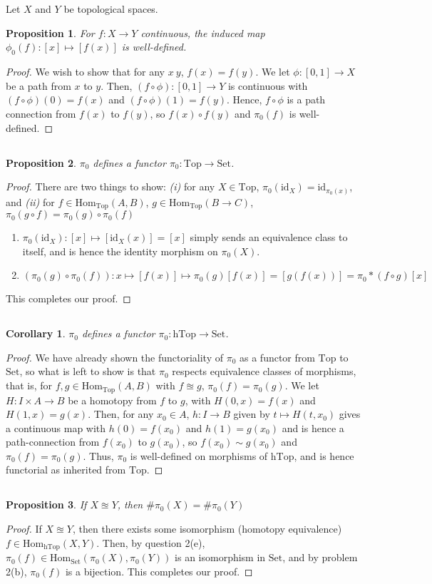 \documentclass[english]{article}
\newcommand{\prob}[1]{\setcounter{section}{#1-1}\section{}}
\newcommand{\prt}[1]{\setcounter{subsection}{#1-1}\subsection{}}
\newtheorem*{proposition*}{Proposition}
\newtheorem*{corollary*}{Corollary}
\theoremstyle{remark}
\theoremstyle{definition}
\newcommand{\id}{\mathrm{id}}
\renewcommand{\hom}{\mathrm{Hom}}
\newcommand{\Top}{\mathrm{Top}}
\renewcommand{\top}{\Top}
\newcommand{\hTop}{\mathrm{hTop}}
\newcommand{\set}{\mathrm{Set}}
\begin{document}
\prob{3}
\prt{1}Let $X$ and $Y$ be topological spaces. \begin{proposition*}
	For $f:X\to Y$ continuous, the induced map $\phi_0(f):[x]\mapsto[f(x)]$ is well-defined.
\end{proposition*}
\begin{proof}
	We wish to show that for any $x~y$, $f(x)=f(y)$. We let $\phi:[0,1]\to X$ be a path from $x$ to $y$. Then, $(f\circ\phi):[0,1]\to Y$ is continuous with $(f\circ\phi)(0)=f(x)$ and $(f\circ \phi)(1)=f(y)$. Hence, $f\circ \phi$ is a path connection from $f(x)$ to $f(y)$, so $f(x)\circ f(y)$ and $\pi_0(f)$ is well-defined.
\end{proof}
\prt{2}\begin{proposition*}
	$\pi_0$ defines a functor $\pi_0:\top\to\set$.
\end{proposition*}
\begin{proof}
	There are two things to show: \emph{(i)} for any $X\in \top$, $\pi_0(\id_X)=\id_{\pi_0(x)}$, and \emph{(ii)} for $f\in \hom_\top(A,B)$, $g\in \hom_{\top}(B\to C)$, $\pi_0(g\circ f)=\pi_0(g)\circ \pi_0(f)$
	\begin{enumerate}[label=\emph{(\roman*)}]
		\item $\pi_0(\id_X):[x]\mapsto [\id_X(x)]=[x]$ simply sends an equivalence class to itself, and is hence the identity morphism on $\pi_0(X)$. 
		\item $(\pi_0(g)\circ \pi_0(f)):x\mapsto [f(x)]\mapsto \pi_0(g)[f(x)]=[g(f(x))]=\pi_0*(f\circ g)[x]$
	\end{enumerate}
This completes our proof.
\end{proof}
\prt{3} \begin{corollary*}
	$\pi_0$ defines a functor $\pi_0:\hTop\to\set$.
\end{corollary*}
\begin{proof}
	We have already shown the functoriality of $\pi_0$ as a functor from $\top$ to $\set$, so what is left to show is that $\pi_0$ respects equivalence classes of morphisms, that is, for $f,g\in \hom_{\top}(A,B)$ with $f\approxeq g$, $\pi_0(f)=\pi_0(g)$. We let $H:I\times A\to B$ be a homotopy from $f$ to $g$, with $H(0,x)=f(x)$ and $H(1,x)=g(x)$. Then, for any $x_0\in A$, $h:I\to B$ given by $t\mapsto H(t,x_0)$ gives a continuous map with $h(0)=f(x_0)$ and $h(1)=g(x_0)$ and is hence a path-connection from $f(x_0)$ to $g(x_0)$, so $f(x_0)\sim g(x_0)$ and $\pi_0(f)=\pi_0(g)$. Thus, $\pi_0$ is well-defined on morphisms of $\hTop$, and is hence functorial as inherited from $\top$.
\end{proof}
\prt{4}\begin{proposition*}
	If $X\approxeq Y$, then $\#\pi_0(X)=\#\pi_0(Y)$
\end{proposition*}
\begin{proof}
If $X\approxeq Y$, then there exists some isomorphism (homotopy equivalence) $f\in \hom_{\hTop}(X,Y)$. Then, by question 2(e), $\pi_0(f)\in \hom_{\set}(\pi_0(X),\pi_0(Y))$ is an isomorphism in $\set$, and by problem 2(b), $\pi_0(f)$ is a bijection. This completes our proof.
\end{proof}
\end{document}
